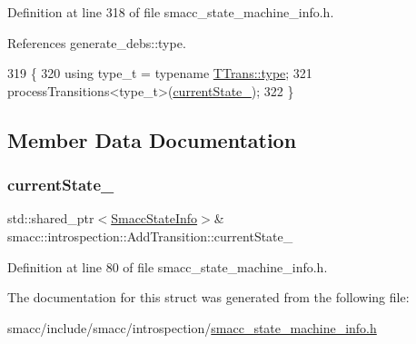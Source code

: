 Definition at line 318 of file smacc\+\_\+state\+\_\+machine\+\_\+info.\+h.



References generate\+\_\+debs\+::type.


\begin{DoxyCode}
319 \{
320     \textcolor{keyword}{using} type\_t = \textcolor{keyword}{typename} \hyperlink{namespacegenerate__debs_a50bc9a7ecac9584553e089a448bcde58}{TTrans::type};
321     processTransitions<type\_t>(\hyperlink{structsmacc_1_1introspection_1_1AddTransition_a56fd9b1bdf6761bbe5258dc915481f4b}{currentState\_});
322 \}
\end{DoxyCode}


\subsection{Member Data Documentation}
\mbox{\label{structsmacc_1_1introspection_1_1AddTransition_a56fd9b1bdf6761bbe5258dc915481f4b}} 
\subsubsection{\texorpdfstring{current\+State\+\_\+}{currentState\_}}
{\footnotesize\ttfamily std\+::shared\+\_\+ptr$<$\hyperlink{classsmacc_1_1introspection_1_1SmaccStateInfo}{Smacc\+State\+Info}$>$\& smacc\+::introspection\+::\+Add\+Transition\+::current\+State\+\_\+}



Definition at line 80 of file smacc\+\_\+state\+\_\+machine\+\_\+info.\+h.



The documentation for this struct was generated from the following file\+:\begin{DoxyCompactItemize}
\item 
smacc/include/smacc/introspection/\hyperlink{smacc__state__machine__info_8h}{smacc\+\_\+state\+\_\+machine\+\_\+info.\+h}\end{DoxyCompactItemize}
